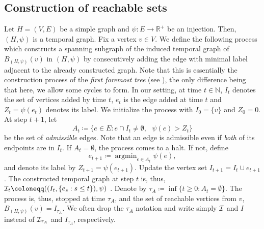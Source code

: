 \documentclass[11pt]{article}
\numberwithin{equation}{section}
\DeclareMathOperator{\argmin}{\mathrm{argmin}}
\theoremstyle{definition}
\newcommand\bN{{\mathbb N}}
\newcommand\bR{{\mathbb R}}
\newcommand\cI{{\cal{I}}}
\begin{document}
\subsection{Construction of reachable sets}
\label{section:construction_process}

Let $H=(V,E)$ be a simple graph and $\psi : E \to \bR^+$ be an injection. Then, $(H,\psi)$ is a temporal graph. Fix a vertex $v \in V$. We define the following process which constructs a spanning subgraph of the induced temporal graph of $B_{(H,\psi)}(v)$ in $(H,\psi)$ by consecutively adding the edge with minimal label adjacent to the already constructed graph. Note that this is essentially the construction process of the \emph{first foremost tree} (see \cite{CRRZ24}), the only difference being that here, we allow some cycles to form. In our setting, at time $t\in\bN$, $I_t$ denotes the set of vertices added by time $t$, $e_t$ is the edge added at time $t$ and $Z_t = \psi(e_t)$ denotes its label. We initialize the process with $I_0 = \{v\}$ and $Z_0 = 0$. At step $t+1$, let 
$$A_t \coloneqq \{e \in E : e \cap I_{t} \neq \emptyset,\textrm{ }  \psi(e) > Z_{t} \}$$ 
be the set of \emph{admissible} edges. Note that an edge is admissible even if \emph{both} of its endpoints are in $I_t$. If $A_t = \emptyset$, the process comes to a halt. If not, define 
$$e_{t+1} \coloneqq \argmin_{e\in A_t} \psi(e),$$ 
and denote its label by $Z_{t+1} = \psi(e_{t+1})$. Update the vertex set $I_{t+1} = I_t \cup e_{t+1}$. The constructed temporal graph at step $t$ is, thus, $\cI_t \coloneqq ((I_t,\{e_s:s\leq t\}),\psi)$%
.  Denote by $\tau_A \coloneqq \inf\{t\geq 0 : A_t = \emptyset \}$. The process is, thus, stopped at time $\tau_A$, and the set of reachable vertices from $v$, $B_{(H,\psi)}(v) = I_{\tau_A}$. We often drop the $\tau_A$ notation and write simply $\cI$ and $I$ instead of $\cI_{\tau_A}$ and $I_{\tau_A}$, respectively. \\ 
\end{document}
